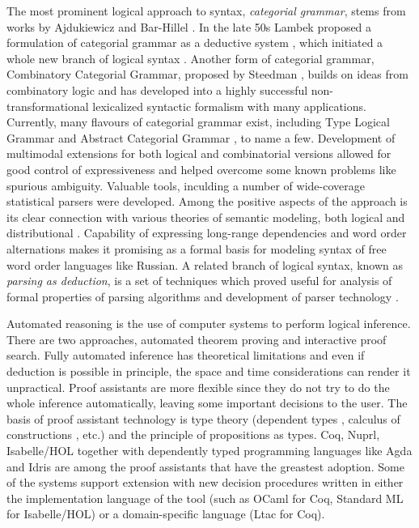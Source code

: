 \documentclass[a4paper]{article}
\theoremstyle{example-style}
\begin{document}
The most prominent logical approach to syntax, \textit{categorial grammar}, stems from works by Ajdukiewicz and Bar-Hillel \parencite{ajdukiewicz1935,bar1953quasi}. In the late 50s Lambek proposed a formulation of categorial grammar as a deductive system \parencite{lambek1958mathematics,lambek1961calculus}, which initiated a whole new branch of logical syntax \parencite{moot2012logic}. Another form of categorial grammar, Combinatory Categorial Grammar, proposed by Steedman \parencite{steedman2000syntactic}, builds on ideas from combinatory logic and has developed into a highly successful non-transformational lexicalized syntactic formalism with many applications. Currently, many flavours of categorial grammar exist, including Type Logical Grammar \parencite{morrill1994type} and Abstract Categorial Grammar \parencite{degroot2001towards}, to name a few. Development of multimodal extensions for both logical and combinatorial versions allowed for good control of expressiveness and helped overcome some known problems like spurious ambiguity. Valuable tools, inculding a number of wide-coverage statistical parsers \parencite{curran2007linguistically,white2008open} were developed. Among the positive aspects of the approach is its clear connection with various theories of semantic modeling, both logical \parencite{steedman2000syntactic,bos2008wide,baldridge2002coupling} and distributional \parencite{maillard2014type}. Capability of expressing long-range dependencies and word order alternations makes it promising as a formal basis for modeling syntax of free word order languages like Russian. A related branch of logical syntax, known as \textit{parsing as deduction}, is a set of techniques which proved useful for analysis of formal properties of parsing algorithms and development of parser technology \parencite{pereira1983parsing,kallmeyer2010parsing}.

Automated reasoning is the use of computer systems to perform logical inference. There are two approaches, automated theorem proving and interactive proof search. Fully automated inference has theoretical limitations and even if deduction is possible in principle, the space and time considerations can render it unpractical. Proof assistants are more flexible since they do not try to do the whole inference automatically, leaving some important decisions to the user. The basis of proof assistant technology is type theory (dependent types \parencite{martinloef1984}, calculus of constructions \parencite{coquand1988calculus}, etc.) and the principle of propositions as types. Coq, Nuprl, Isabelle/HOL together with dependently typed programming languages like Agda and Idris are among the proof assistants that have the greastest adoption. Some of the systems support extension with new decision procedures written in either the implementation language of the tool (such as OCaml for Coq, Standard ML for Isabelle/HOL) or a  domain-specific language (Ltac for Coq).
\end{document}
